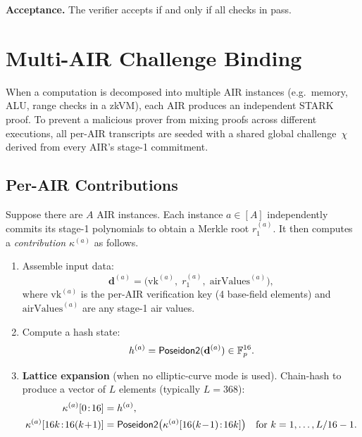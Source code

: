 \medskip
\noindent
\textbf{Acceptance.}
The verifier accepts if and only if all checks in
 pass.

\section{Multi-AIR Challenge Binding}
\label{sec:challenge-binding}

When a computation is decomposed into multiple AIR instances
(e.g.\ memory, ALU, range checks in a zkVM),
each AIR produces an independent STARK proof.
To prevent a malicious prover from mixing proofs across different executions,
all per-AIR transcripts are seeded with a shared global challenge~$\chi$
derived from every AIR's stage-1 commitment.

\subsection{Per-AIR Contributions}
\label{sec:contributions}

Suppose there are $A$ AIR instances.
Each instance $a \in [A]$ independently commits its stage-1 polynomials
to obtain a Merkle root $r_1^{(a)}$.
It then computes a \emph{contribution} $\kappa^{(a)}$ as follows.

\begin{enumerate}[label=(\roman*)]
  \item Assemble input data:
        \[
          \mathbf{d}^{(a)} = \bigl(\mathrm{vk}^{(a)},\; r_1^{(a)},\; \mathrm{airValues}^{(a)}\bigr),
        \]
        where $\mathrm{vk}^{(a)}$ is the per-AIR verification key (4 base-field elements)
        and $\mathrm{airValues}^{(a)}$ are any stage-1 air values.

  \item Compute a hash state:
        \[
          h^{(a)} = \textsf{Poseidon2}(\mathbf{d}^{(a)}) \in \mathbb{F}_p^{16}.
        \]

  \item \textbf{Lattice expansion} (when no elliptic-curve mode is used).
        Chain-hash to produce a vector of $L$ elements
        (typically $L = 368$):
        \begin{align*}
          \kappa^{(a)}[0\!:\!16] &= h^{(a)}, \\
          \kappa^{(a)}[16k\!:\!16(k\!+\!1)] &= \Poseidon\bigl(\kappa^{(a)}[16(k\!-\!1)\!:\!16k]\bigr)
          \quad \text{for } k = 1, \ldots, L/16 - 1.
        \end{align*}
\end{enumerate}

